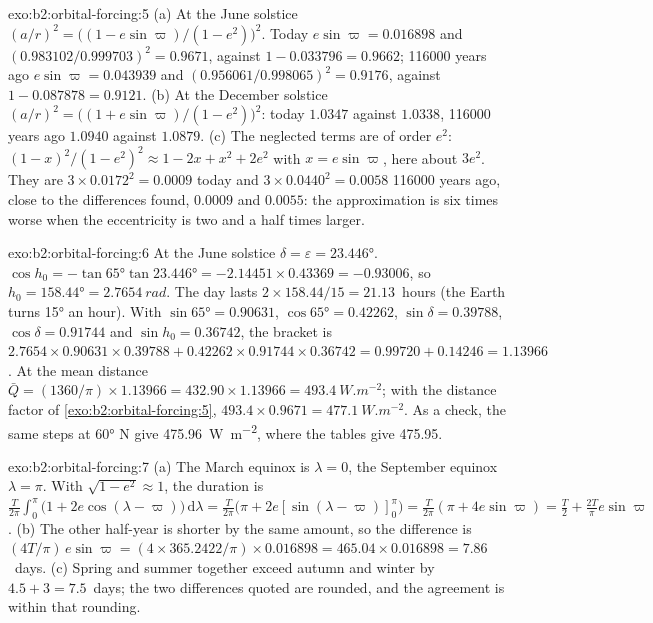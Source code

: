 \begin{solution}{exo:b2:orbital-forcing:5}
(a) At the June solstice $(a/r)^2 = \bigl((1 - e\sin\varpi)/(1 - e^2)\bigr)^2$. Today $e\sin\varpi
= 0.016898$ and $(0.983102/0.999703)^2 = 0.9671$, against $1 - 0.033796 = 0.9662$;
\num{116000} years ago $e\sin\varpi = 0.043939$ and $(0.956061/0.998065)^2 = 0.9176$, against $1 -
0.087878 = 0.9121$. (b) At the December solstice $(a/r)^2 = \bigl((1 + e\sin\varpi)/(1 -
e^2)\bigr)^2$: today $1.0347$ against $1.0338$, \num{116000} years ago $1.0940$ against $1.0879$.
(c) The neglected terms are of order $e^2$: $(1 - x)^2/(1 - e^2)^2 \approx 1 - 2x + x^2 + 2e^2$
with $x = e\sin\varpi$, here about $3e^2$. They are $3 \times 0.0172^2 = 0.0009$ today and $3
\times 0.0440^2 = 0.0058$ \num{116000} years ago, close to the differences found, $0.0009$ and
$0.0055$: the approximation is six times worse when the eccentricity is two and a half times
larger.
\end{solution}

\begin{solution}{exo:b2:orbital-forcing:6}
At the June solstice $\delta = \varepsilon = \ang{23.446}$. $\cos h_0 = -\tan\ang{65}\tan\ang{23.446}
= -2.14451 \times 0.43369 = -0.93006$, so $h_0 = \ang{158.44} = \qty{2.7654}{rad}$. The day lasts
$2 \times 158.44/15 = 21.13$~hours (the Earth turns \ang{15} an hour). With $\sin\ang{65} = 0.90631$,
$\cos\ang{65} = 0.42262$, $\sin\delta = 0.39788$, $\cos\delta = 0.91744$ and $\sin h_0 = 0.36742$,
the bracket is $2.7654 \times 0.90631 \times 0.39788 + 0.42262 \times 0.91744 \times 0.36742 = 0.99720
+ 0.14246 = 1.13966$. At the mean distance $\bar Q = (1360/\pi) \times 1.13966 = 432.90 \times 1.13966
= \qty{493.4}{W.m^{-2}}$; with the distance factor of \cref{exo:b2:orbital-forcing:5}, $493.4 \times
0.9671 = \qty{477.1}{W.m^{-2}}$. As a check, the same steps at \ang{60} N give \qty{475.96}{W.m^{-2}}, where the tables give \num{475.95}.
\end{solution}

\begin{solution}{exo:b2:orbital-forcing:7}
(a) The March equinox is $\lambda = 0$, the September equinox $\lambda = \pi$. With $\sqrt{1 - e^2}
\approx 1$, the duration is $\frac{T}{2\pi}\int_0^{\pi}\bigl(1 + 2e\cos(\lambda -
\varpi)\bigr)\,\mathrm d\lambda = \frac{T}{2\pi}\bigl(\pi + 2e[\sin(\lambda - \varpi)]_0^{\pi}\bigr)
= \frac{T}{2\pi}(\pi + 4e\sin\varpi) = \frac T2 + \frac{2T}{\pi}e\sin\varpi$. (b) The other half-year
is shorter by the same amount, so the difference is $(4T/\pi)\,e\sin\varpi = (4 \times
365.2422/\pi) \times 0.016898 = 465.04 \times 0.016898 = 7.86$~days. (c) Spring and summer together
exceed autumn and winter by $4.5 + 3 = 7.5$~days; the two differences quoted are rounded, and the
agreement is within that rounding.
\end{solution}

